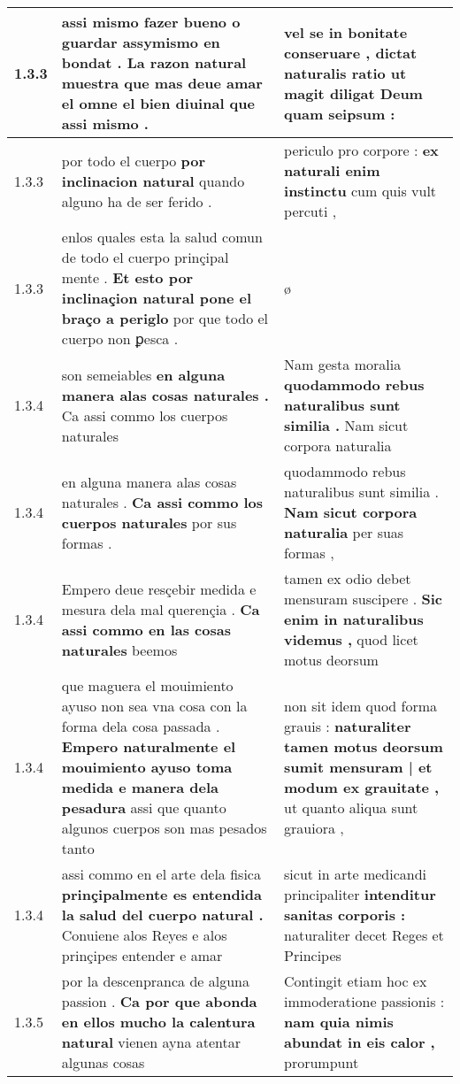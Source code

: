 \begin{tabular}{|p{1cm}|p{6.5cm}|p{6.5cm}|}
1.3.3 & assi mismo fazer bueno o guardar \textbf{ assymismo en bondat . La razon natural muestra } que mas deue amar el omne el bien diuinal que assi mismo . & vel se in bonitate conseruare , \textbf{ dictat naturalis ratio } ut magit diligat Deum quam seipsum : \\\hline
1.3.3 & por todo el cuerpo \textbf{ por inclinacion natural } quando alguno ha de ser ferido . & periculo pro corpore : \textbf{ ex naturali enim instinctu } cum quis vult percuti , \\\hline
1.3.3 & enlos quales esta la salud comun de todo el cuerpo prinçipal mente . \textbf{ Et esto por inclinaçion natural pone el braço a periglo } por que todo el cuerpo non ꝑesca . & ø \\\hline
1.3.4 & son semeiables \textbf{ en alguna manera alas cosas naturales . } Ca assi commo los cuerpos naturales & Nam gesta moralia \textbf{ quodammodo rebus naturalibus sunt similia . } Nam sicut corpora naturalia \\\hline
1.3.4 & en alguna manera alas cosas naturales . \textbf{ Ca assi commo los cuerpos naturales } por sus formas . & quodammodo rebus naturalibus sunt similia . \textbf{ Nam sicut corpora naturalia } per suas formas , \\\hline
1.3.4 & Empero deue resçebir medida e mesura dela mal querençia . \textbf{ Ca assi commo en las cosas naturales } beemos & tamen ex odio debet mensuram suscipere . \textbf{ Sic enim in naturalibus videmus , } quod licet motus deorsum \\\hline
1.3.4 & que maguera el mouimiento ayuso non sea vna cosa con la forma dela cosa passada . \textbf{ Empero naturalmente el mouimiento ayuso toma medida e manera dela pesadura } assi que quanto algunos cuerpos son mas pesados tanto & non sit idem quod forma grauis : \textbf{ naturaliter tamen motus deorsum sumit mensuram | et modum ex grauitate , } ut quanto aliqua sunt grauiora , \\\hline
1.3.4 & assi commo en el arte dela fisica \textbf{ prinçipalmente es entendida la salud del cuerpo natural . } Conuiene alos Reyes e alos prinçipes entender e amar & sicut in arte medicandi principaliter \textbf{ intenditur sanitas corporis : } naturaliter decet Reges et Principes \\\hline
1.3.5 & por la descenpranca de alguna passion . \textbf{ Ca por que abonda en ellos mucho la calentura natural } vienen ayna atentar algunas cosas & Contingit etiam hoc ex immoderatione passionis : \textbf{ nam quia nimis abundat in eis calor , } prorumpunt \\\hline

\end{tabular}
